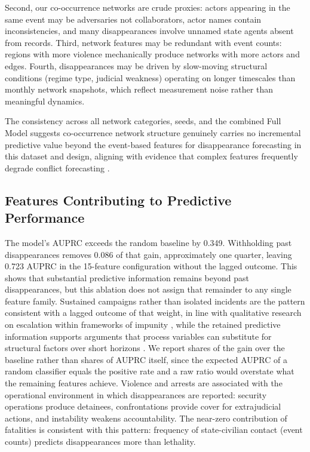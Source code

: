 \documentclass[pdflatex,sn-mathphys-num]{sn-jnl}%
\theoremstyle{thmstyleone}%
\theoremstyle{thmstyletwo}%
\theoremstyle{thmstylethree}%
\begin{document}
Second, our co-occurrence networks are crude proxies: actors appearing in the same event may be adversaries not collaborators, actor names contain inconsistencies, and many disappearances involve unnamed state agents absent from records. Third, network features may be redundant with event counts: regions with more violence mechanically produce networks with more actors and edges. Fourth, disappearances may be driven by slow-moving structural conditions (regime type, judicial weakness) operating on longer timescales than monthly network snapshots, which reflect measurement noise rather than meaningful dynamics.

The consistency across all network categories, seeds, and the combined Full Model suggests co-occurrence network structure genuinely carries no incremental predictive value beyond the event-based features for disappearance forecasting in this dataset and design, aligning with evidence that complex features frequently degrade conflict forecasting \cite{chadefaux2025endogenous, vesco2022united}.

\subsection{Features Contributing to Predictive Performance}

The model's AUPRC exceeds the random baseline by 0.349. Withholding past disappearances removes 0.086 of that gain, approximately one quarter, leaving 0.723 AUPRC in the 15-feature configuration without the lagged outcome. This shows that substantial predictive information remains beyond past disappearances, but this ablation does not assign that remainder to any single feature family. Sustained campaigns rather than isolated incidents are the pattern consistent with a lagged outcome of that weight, in line with qualitative research on escalation within frameworks of impunity \cite{amnesty2024disappearances}, while the retained predictive information supports arguments that process variables can substitute for structural factors over short horizons \cite{blair2020forecasting}. We report shares of the gain over the baseline rather than shares of AUPRC itself, since the expected AUPRC of a random classifier equals the positive rate and a raw ratio would overstate what the remaining features achieve. Violence and arrests are associated with the operational environment in which disappearances are reported: security operations produce detainees, confrontations provide cover for extrajudicial actions, and instability weakens accountability. The near-zero contribution of fatalities is consistent with this pattern: frequency of state-civilian contact (event counts) predicts disappearances more than lethality.
\end{document}

